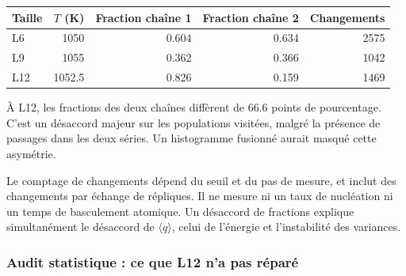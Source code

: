 \begin{center}\small\begin{tabular}{lrrrr}\toprule

Taille & $T$ (K) & Fraction chaîne 1 & Fraction chaîne 2 & Changements\\\midrule

L6 & 1050 & 0.604 & 0.634 & 2575\\

L9 & 1055 & 0.362 & 0.366 & 1042\\

L12 & 1052.5 & 0.826 & 0.159 & 1469\\

\bottomrule\end{tabular}\end{center}

À L12, les fractions des deux chaînes diffèrent de 66.6 points de pourcentage. C’est un désaccord majeur sur les populations visitées, malgré la présence de passages dans les deux séries. Un histogramme fusionné aurait masqué cette asymétrie.

Le comptage de changements dépend du seuil et du pas de mesure, et inclut des changements par échange de répliques. Il ne mesure ni un taux de nucléation ni un temps de basculement atomique. Un désaccord de fractions explique simultanément le désaccord de $\langle q\rangle$, celui de l’énergie et l’instabilité des variances.

\subsubsection{Audit statistique : ce que L12 n’a pas réparé}


